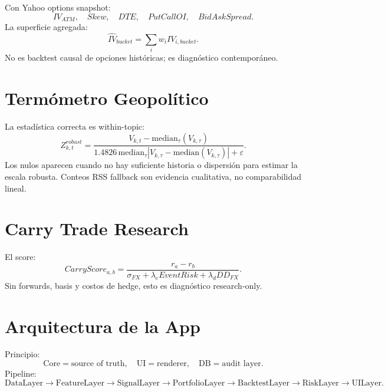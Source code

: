 \documentclass[11pt,letterpaper]{article}
\newcommand{\1}{\mathbbm{1}}
\newcommand{\eps}{\varepsilon}
\begin{document}
Con Yahoo options snapshot:
\[
IV_{ATM},\quad Skew,\quad DTE,\quad PutCallOI,\quad BidAskSpread.
\]
La superficie agregada:
\[
\widehat{IV}_{bucket}
=
\sum_i w_i IV_{i,bucket}.
\]
No es backtest causal de opciones históricas; es diagnóstico contemporáneo.

\section{Termómetro Geopolítico}

La estadística correcta es within-topic:
\[
Z_{k,t}^{robust}
=
\frac{V_{k,t}-\mathrm{median}_\tau(V_{k,\tau})}
{1.4826\,\mathrm{median}_\tau|V_{k,\tau}-\mathrm{median}(V_{k,\tau})|+\eps}.
\]
Los nulos aparecen cuando no hay suficiente historia o dispersión para estimar la escala robusta. Conteos RSS fallback son evidencia cualitativa, no comparabilidad lineal.

\section{Carry Trade Research}

El score:
\[
CarryScore_{a,b}
=
\frac{r_a-r_b}
{\sigma_{FX}+\lambda_eEventRisk+\lambda_dDD_{FX}}.
\]
Sin forwards, basis y costos de hedge, esto es diagnóstico research-only.

\section{Arquitectura de la App}

Principio:
\[
\mathrm{Core}=\text{source of truth},\quad
\mathrm{UI}=\text{renderer},\quad
\mathrm{DB}=\text{audit layer}.
\]
Pipeline:
\[
\mathrm{DataLayer}
\rightarrow
\mathrm{FeatureLayer}
\rightarrow
\mathrm{SignalLayer}
\rightarrow
\mathrm{PortfolioLayer}
\rightarrow
\mathrm{BacktestLayer}
\rightarrow
\mathrm{RiskLayer}
\rightarrow
\mathrm{UILayer}.
\]
\end{document}
